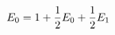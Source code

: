 \documentclass[preview]{standalone}
\begin{document}
\begin{align*}
\special{dvisvgm:raw <g id='unique000'>}E_0=1+\dfrac12E_0+\dfrac12E_1\special{dvisvgm:raw </g>}
\end{align*}
\end{document}
